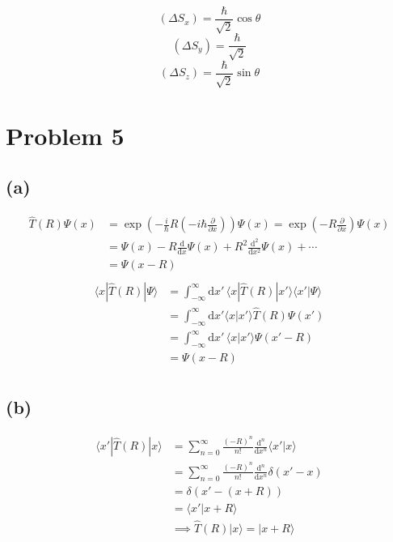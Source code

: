 \documentclass[letter]{article}
\newcommand{\hb}{\hbar}
\begin{document}
\[
\boxed{
	(\Delta S_x) = \frac{\hb}{\sqrt{2} } \cos \theta 
}
\] 
\[
\boxed{
	(\Delta S_y) = \frac{\hb}{\sqrt{2} }
}
\] 
\[
\boxed{
	(\Delta S_z) = \frac{\hb}{\sqrt{2} } \sin \theta 
}
\] 
\section*{Problem 5}  \subsection*{(a)} 
\begin{align*}
	\hat{T}(R) \Psi(x)&= 
\exp
\left(
- \frac{i}{\hb} R \left(- i \hb \frac{\partial }{\partial x}\right) 
\right) \Psi(x) = \exp
\left(
- R \frac{\partial}{\partial x}
\right) \Psi(x) 
	\\ 
	&= 
\Psi(x) - R \frac{\mathrm{d} }{\mathrm{d} x} \Psi(x) + R^2 
\frac{\mathrm{d} ^2 }{\mathrm{d} x^2} \Psi(x) + \cdots 
	\\ 
	&= 
	\Psi(x - R) \tag{Similar to expansion of $f(x-a)$ } 
	\\
\end{align*}
\begin{align*}
	\langle x | \hat{T}(R) | \Psi \rangle  &= 
\int_{-\infty}^{\infty} \mathrm{d} x' \, 
\langle x | \hat{T}(R) | x' \rangle \langle x' | \Psi \rangle 
	\\ 
	&= 
\int_{-\infty}^{\infty} \mathrm{d} x ' 
\langle x | x' \rangle 
\hat{T}(R) \Psi(x')
	\\
	&= 
\int_{-\infty}^{\infty} \mathrm{d} x  ' 
\, 
\langle x |  x' \rangle 
\Psi(x' - R)
	\\ 
	&= 
\Psi(x - R)
	\\
\end{align*}


\subsection*{(b)} 
\begin{align*}
	\langle x' |  \hat{T}(R) | x \rangle  
	&= 
\sum_{n=0}^{\infty} \frac{(-R)^{n} }{n!} \frac{\mathrm{d} ^{n}}{\mathrm{d} x^{n} } \langle x' | x \rangle 
     \\ & = 
\sum_{n=0}^{\infty} \frac{(-R)^{n} }{n!} \frac{\mathrm{d} ^{n}}{\mathrm{d} x^{n} } \delta(x' - x ) 
\\ &= 
\delta(x' - (x+ R))
\\ 
&= 
\langle x' | x + R \rangle 
\\ 
& \implies 
\hat{T}(R) | x \rangle  = | x + R \rangle 
\end{align*}
\end{document}
